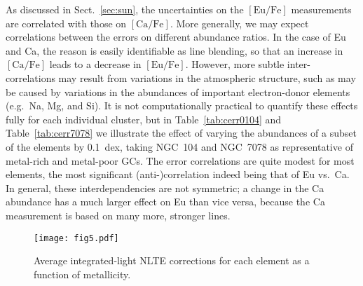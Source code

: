 \documentclass{aa}
\begin{document}
As discussed in Sect.~\ref{sec:sun}, the uncertainties on the $\mathrm{[Eu/Fe]}$ measurements are correlated with those on $\mathrm{[Ca/Fe]}$. More generally, we may expect correlations between the errors on different abundance ratios. In the case of Eu and Ca, the reason is easily identifiable as line blending, so that an increase in $\mathrm{[Ca/Fe]}$ leads to a decrease in $\mathrm{[Eu/Fe]}$. However, more subtle inter-correlations may result from variations in the atmospheric structure, such as may be caused by variations in the abundances of important electron-donor elements (e.g.\ Na, Mg, and Si).
It is not computationally practical to quantify these effects fully for each individual cluster, but in Table~\ref{tab:cerr0104} and Table~\ref{tab:cerr7078} we illustrate the effect of varying the abundances of a subset of the elements by 0.1~dex, taking NGC~104 and NGC~7078 as representative of metal-rich and metal-poor GCs.
The error correlations are quite modest for most elements, the most significant (anti-)correlation indeed being that of Eu vs.\ Ca. In general, these interdependencies are not symmetric; a change in the Ca abundance has a much larger effect on Eu than vice versa, because the Ca measurement is based on many more, stronger lines. 
%
\begin{figure}
\centering
\texttt{[image: fig5.pdf]}
\caption{\label{fig:dnlte}Average integrated-light NLTE corrections for each element as a function of metallicity.}
\end{figure}
\end{document}
